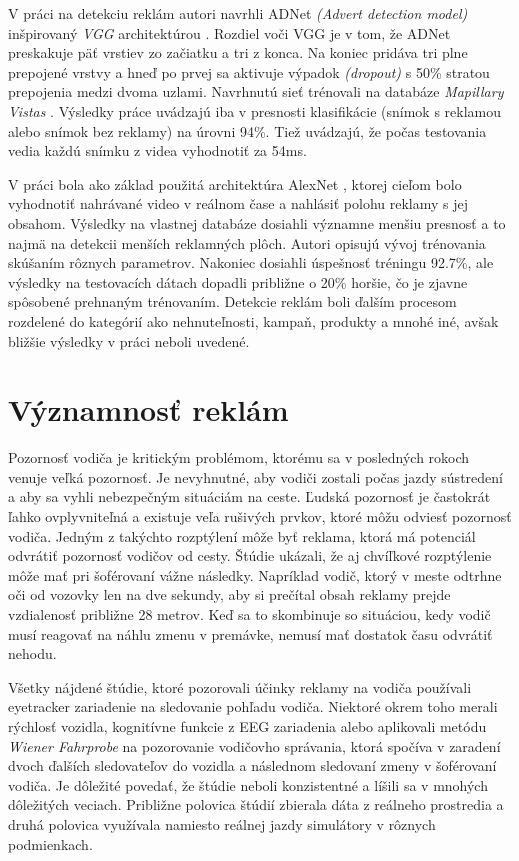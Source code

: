 V práci \cite{Hossari} na detekciu reklám autori navrhli ADNet \textit{(Advert detection model)} inšpirovaný \textit{VGG} architektúrou \cite{simonyan2015deep}. Rozdiel voči VGG je v tom, že ADNet preskakuje päť vrstiev zo začiatku a tri z konca. Na koniec pridáva tri plne prepojené vrstvy a hneď po prvej sa aktivuje výpadok \textit{(dropout)} s 50\% stratou prepojenia medzi dvoma uzlami. Navrhnutú sieť trénovali na databáze \textit{Mapillary Vistas} \cite{Mapillary}. Výsledky práce uvádzajú iba v presnosti klasifikácie (snímok s reklamou alebo snímok bez reklamy) na úrovni 94\%. Tiež uvádzajú, že počas testovania vedia každú snímku z videa vyhodnotiť za 54ms.

V práci \cite{GeoTag} bola ako základ použitá architektúra AlexNet \cite{AlexNet}, ktorej cieľom bolo vyhodnotiť nahrávané video v reálnom čase a nahlásiť polohu reklamy s jej obsahom. Výsledky na vlastnej databáze dosiahli významne menšiu presnosť a to najmä na detekcii menších reklamných plôch. Autori opisujú vývoj trénovania skúšaním rôznych parametrov. Nakoniec dosiahli úspešnosť tréningu 92.7\%, ale výsledky na testovacích dátach dopadli približne o 20\% horšie, čo je zjavne spôsobené prehnaným trénovaním. Detekcie reklám boli ďalším procesom rozdelené do kategórií ako nehnuteľnosti, kampaň, produkty a mnohé iné, avšak bližšie výsledky v práci neboli uvedené.

\section{Významnosť reklám}

Pozornosť vodiča je kritickým problémom, ktorému sa v posledných rokoch venuje veľká pozornosť. Je nevyhnutné, aby vodiči zostali počas jazdy sústredení  a aby sa vyhli nebezpečným situáciám na ceste. Ľudská pozornosť je častokrát ľahko ovplyvniteľná a existuje veľa rušivých prvkov, ktoré môžu odviesť pozornosť vodiča. Jedným z takýchto rozptýlení môže byť reklama, ktorá má potenciál odvrátiť pozornosť vodičov od cesty. Štúdie ukázali, že aj chvíľkové rozptýlenie môže mať pri šoférovaní vážne následky. Napríklad vodič, ktorý v meste odtrhne oči od vozovky len na dve sekundy, aby si prečítal obsah reklamy prejde vzdialenosť približne 28 metrov. Keď sa to skombinuje so situáciou, kedy vodič musí reagovať na náhlu zmenu v premávke, nemusí mať dostatok času odvrátiť nehodu.

Všetky nájdené štúdie, ktoré pozorovali účinky reklamy na vodiča používali eyetracker zariadenie na sledovanie pohľadu vodiča. Niektoré okrem toho merali rýchlosť vozidla, kognitívne funkcie z EEG zariadenia alebo aplikovali metódu \textit{Wiener Fahrprobe} \cite{WF} na pozorovanie vodičovho správania, ktorá spočíva v zaradení dvoch ďalších sledovateľov do vozidla a následnom sledovaní zmeny v šoférovaní vodiča.  Je dôležité povedať, že štúdie neboli konzistentné a líšili sa v mnohých dôležitých veciach. Približne polovica štúdií zbierala dáta z reálneho prostredia a druhá polovica využívala namiesto reálnej jazdy simulátory v rôznych podmienkach.

